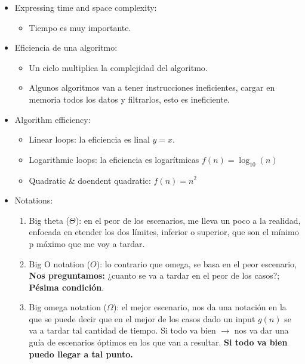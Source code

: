 \begin{itemize}
    \item Expressing time and space complexity:
        \begin{itemize}
            \item Tiempo es muy importante.
        \end{itemize}
    
    \item Eficiencia de una algoritmo:
        \begin{itemize}
            \item Un ciclo multiplica la complejidad del algoritmo.
            \item Algunos algoritmos van a tener instrucciones ineficientes, cargar en memoria todos los datos y filtrarlos, esto es ineficiente. 
        \end{itemize}
    
    \item Algorithm efficiency:
        \begin{itemize}
            \item Linear loops: la eficiencia es linal $y=x$.
            \item Logarithmic loops: la eficiencia es logarítmicas $f(n) = \log_{10}(n)$
            \item Quadratic \& doendent quadratic: $f(n) = n^{2}$
        \end{itemize}
    
    \item Notations:
        \begin{enumerate}
            \item Big theta ($\Theta $): en el peor de los escenarios, me lleva un poco a la realidad, enfocada en etender los dos límites, inferior o superior, que son el mínimo p máximo que me voy a tardar.
            \item Big O notation ($O$): lo contrario que omega, se basa en el peor escenario, \textbf{Nos preguntamos:} ¿cuanto se va a tardar en el peor de los casos?; \textbf{Pésima condición}.
            \item Big omega notation ($\Omega $): el mejor escenario, nos da una notación en la que se puede decir que en el mejor de los casos dado un input $g(n)$ se va a tardar tal cantidad de tiempo. Si todo va bien $\rightarrow$ nos va dar una guía de escenarios óptimos en los que van a resultar.  \textbf{Si todo va bien puedo llegar a tal punto.}
        \end{enumerate}
    

\end{itemize}

